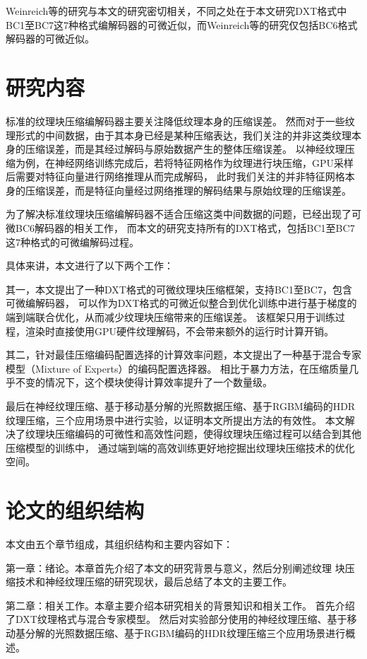 Weinreich等的研究与本文的研究密切相关，不同之处在于本文研究DXT格式中BC1至BC7这7种格式编解码器的可微近似，而Weinreich等的研究仅包括BC6格式解码器的可微近似。

\section{研究内容}

标准的纹理块压缩编解码器主要关注降低纹理本身的压缩误差。
然而对于一些纹理形式的中间数据，由于其本身已经是某种压缩表达，我们关注的并非这类纹理本身的压缩误差，而是其经过解码与原始数据产生的整体压缩误差。
以神经纹理压缩为例，在神经网络训练完成后，若将特征网格作为纹理进行块压缩，GPU采样后需要对特征向量进行网络推理从而完成解码，
此时我们关注的并非特征网格本身的压缩误差，而是特征向量经过网络推理的解码结果与原始纹理的压缩误差。

为了解决标准纹理块压缩编解码器不适合压缩这类中间数据的问题，已经出现了可微BC6解码器的相关工作\cite{weinreich2024real}，
而本文的研究支持所有的DXT格式，包括BC1至BC7这7种格式的可微编解码过程。

具体来讲，本文进行了以下两个工作：

其一，本文提出了一种DXT格式的可微纹理块压缩框架，支持BC1至BC7，包含可微编解码器，
可以作为DXT格式的可微近似整合到优化训练中进行基于梯度的端到端联合优化，从而减少纹理块压缩带来的压缩误差。
该框架只用于训练过程，渲染时直接使用GPU硬件纹理解码，不会带来额外的运行时计算开销。

其二，针对最佳压缩编码配置选择的计算效率问题，本文提出了一种基于混合专家模型（Mixture of Experts）的编码配置选择器。
相比于暴力方法，在压缩质量几乎不变的情况下，这个模块使得计算效率提升了一个数量级。

最后在神经纹理压缩、基于移动基分解的光照数据压缩、基于RGBM编码的HDR纹理压缩，三个应用场景中进行实验，以证明本文所提出方法的有效性。
本文解决了纹理块压缩编码的可微性和高效性问题，使得纹理块压缩过程可以结合到其他压缩模型的训练中，
通过端到端的高效训练更好地挖掘出纹理块压缩技术的优化空间。

\section{论文的组织结构}

本文由五个章节组成，其组织结构和主要内容如下：

第一章：绪论。本章首先介绍了本文的研究背景与意义，然后分别阐述纹理
块压缩技术和神经纹理压缩的研究现状，最后总结了本文的主要工作。

第二章：相关工作。本章主要介绍本研究相关的背景知识和相关工作。
首先介绍了DXT纹理格式与混合专家模型。
然后对实验部分使用的神经纹理压缩、基于移动基分解的光照数据压缩、基于RGBM编码的HDR纹理压缩三个应用场景进行概述。

